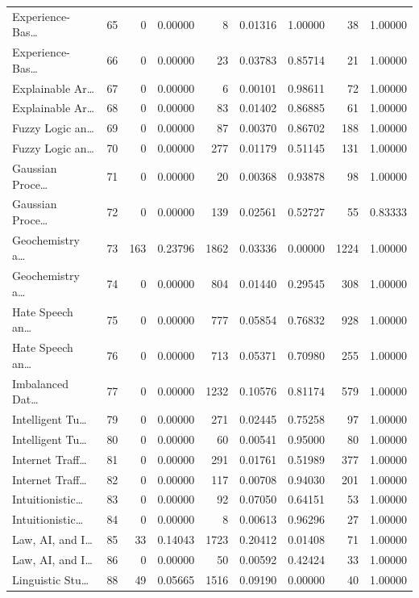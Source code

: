 \begin{table}
\begin{tabular}{lrrrrrrrr}
Experience-Bas… & 65 & 0 & 0.00000 & 8 & 0.01316 & 1.00000 & 38 & 1.00000 \\
Experience-Bas… & 66 & 0 & 0.00000 & 23 & 0.03783 & 0.85714 & 21 & 1.00000 \\
Explainable Ar… & 67 & 0 & 0.00000 & 6 & 0.00101 & 0.98611 & 72 & 1.00000 \\
Explainable Ar… & 68 & 0 & 0.00000 & 83 & 0.01402 & 0.86885 & 61 & 1.00000 \\
Fuzzy Logic an… & 69 & 0 & 0.00000 & 87 & 0.00370 & 0.86702 & 188 & 1.00000 \\
Fuzzy Logic an… & 70 & 0 & 0.00000 & 277 & 0.01179 & 0.51145 & 131 & 1.00000 \\
Gaussian Proce… & 71 & 0 & 0.00000 & 20 & 0.00368 & 0.93878 & 98 & 1.00000 \\
Gaussian Proce… & 72 & 0 & 0.00000 & 139 & 0.02561 & 0.52727 & 55 & 0.83333 \\
Geochemistry a… & 73 & 163 & 0.23796 & 1862 & 0.03336 & 0.00000 & 1224 & 1.00000 \\
Geochemistry a… & 74 & 0 & 0.00000 & 804 & 0.01440 & 0.29545 & 308 & 1.00000 \\
Hate Speech an… & 75 & 0 & 0.00000 & 777 & 0.05854 & 0.76832 & 928 & 1.00000 \\
Hate Speech an… & 76 & 0 & 0.00000 & 713 & 0.05371 & 0.70980 & 255 & 1.00000 \\
Imbalanced Dat… & 77 & 0 & 0.00000 & 1232 & 0.10576 & 0.81174 & 579 & 1.00000 \\
Intelligent Tu… & 79 & 0 & 0.00000 & 271 & 0.02445 & 0.75258 & 97 & 1.00000 \\
Intelligent Tu… & 80 & 0 & 0.00000 & 60 & 0.00541 & 0.95000 & 80 & 1.00000 \\
Internet Traff… & 81 & 0 & 0.00000 & 291 & 0.01761 & 0.51989 & 377 & 1.00000 \\
Internet Traff… & 82 & 0 & 0.00000 & 117 & 0.00708 & 0.94030 & 201 & 1.00000 \\
Intuitionistic… & 83 & 0 & 0.00000 & 92 & 0.07050 & 0.64151 & 53 & 1.00000 \\
Intuitionistic… & 84 & 0 & 0.00000 & 8 & 0.00613 & 0.96296 & 27 & 1.00000 \\
Law, AI, and I… & 85 & 33 & 0.14043 & 1723 & 0.20412 & 0.01408 & 71 & 1.00000 \\
Law, AI, and I… & 86 & 0 & 0.00000 & 50 & 0.00592 & 0.42424 & 33 & 1.00000 \\
Linguistic Stu… & 88 & 49 & 0.05665 & 1516 & 0.09190 & 0.00000 & 40 & 1.00000 \\

\end{tabular}
\end{table}
